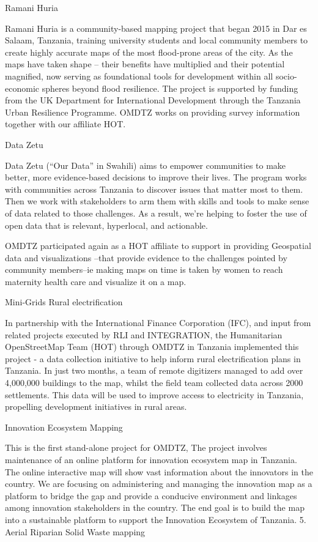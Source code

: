 \documentclass[a4paper,12pt,twoside]{article}
\begin{document}
Ramani Huria

Ramani Huria is a community-based mapping project that began 2015 in Dar es Salaam, Tanzania, training university students and local community members to create highly accurate maps of the most flood-prone areas of the city. As the maps have taken shape – their benefits have multiplied and their potential magnified, now serving as foundational tools for development within all socio-economic spheres beyond flood resilience. The project is supported by funding from the UK Department for International Development through the Tanzania Urban Resilience Programme. OMDTZ works on providing survey information together with our affiliate HOT.


Data Zetu

Data Zetu (“Our Data” in Swahili) aims to empower communities to make better, more evidence-based decisions to improve their lives. The program works with communities across Tanzania to discover issues that matter most to them. Then we work with stakeholders to arm them with skills and tools to make sense of data related to those challenges. As a result, we’re helping to foster the use of open data that is relevant, hyperlocal, and actionable.

OMDTZ participated again as a HOT affiliate to support in providing Geospatial data and visualizations --that provide evidence to the challenges pointed by community members--ie making maps on time is taken by women to reach maternity health care and visualize it on a map. 

Mini-Grids Rural electrification

In partnership with the International Finance Corporation (IFC), and input from related projects executed by RLI and INTEGRATION, the Humanitarian OpenStreetMap Team (HOT) through OMDTZ in Tanzania implemented this project - a data collection initiative to help inform rural electrification plans in Tanzania. In just two months, a team of remote digitizers managed to add over 4,000,000 buildings to the map, whilst the field team collected data across 2000 settlements. This data will be used to improve access to electricity in Tanzania, propelling development initiatives in rural areas.  

Innovation Ecosystem Mapping

This is the first stand-alone project for OMDTZ, The project involves maintenance of an online platform for innovation ecosystem map in Tanzania. The online interactive map will show vast information about the innovators in the country. We are focusing on administering and managing the innovation map as a platform to bridge the gap and provide a conducive environment and linkages among innovation stakeholders in the country. The end goal is to build the map into a sustainable platform to support the Innovation Ecosystem of Tanzania. 
5. Aerial Riparian Solid Waste mapping
\end{document}
